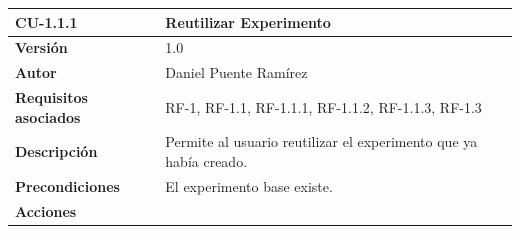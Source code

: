 \begin{longtable}[H]{@{}ll@{}}
\toprule
\begin{minipage}[b]{0.23\columnwidth}\raggedright\strut
\textbf{CU-1.1.1}\strut
\end{minipage} & \begin{minipage}[b]{0.71\columnwidth}\raggedright\strut
\textbf{Reutilizar Experimento}\strut
\end{minipage}\tabularnewline
\midrule
\endhead
\begin{minipage}[t]{0.23\columnwidth}\raggedright\strut
\textbf{Versión}\strut
\end{minipage} & \begin{minipage}[t]{0.71\columnwidth}\raggedright\strut
1.0\strut
\end{minipage}\tabularnewline
\begin{minipage}[t]{0.23\columnwidth}\raggedright\strut
\textbf{Autor}\strut
\end{minipage} & \begin{minipage}[t]{0.71\columnwidth}\raggedright\strut
Daniel Puente Ramírez\strut
\end{minipage}\tabularnewline
\begin{minipage}[t]{0.23\columnwidth}\raggedright\strut
\textbf{Requisitos asociados}\strut
\end{minipage} & \begin{minipage}[t]{0.71\columnwidth}\raggedright\strut
RF-1, RF-1.1, RF-1.1.1, RF-1.1.2, RF-1.1.3, RF-1.3\strut
\end{minipage}\tabularnewline
\begin{minipage}[t]{0.23\columnwidth}\raggedright\strut
\textbf{Descripción}\strut
\end{minipage} & \begin{minipage}[t]{0.71\columnwidth}\raggedright\strut
Permite al usuario reutilizar el experimento que ya había creado.\strut
\end{minipage}\tabularnewline
\begin{minipage}[t]{0.23\columnwidth}\raggedright\strut
\textbf{Precondiciones}\strut
\end{minipage} & \begin{minipage}[t]{0.71\columnwidth}\raggedright\strut
El experimento base existe.\strut
\end{minipage}\tabularnewline
\begin{minipage}[t]{0.23\columnwidth}\raggedright\strut
\textbf{Acciones}\strut
\end{minipage} & \begin{minipage}[t]{0.71\columnwidth}\raggedright\strut

\end{minipage}
\end{longtable}
